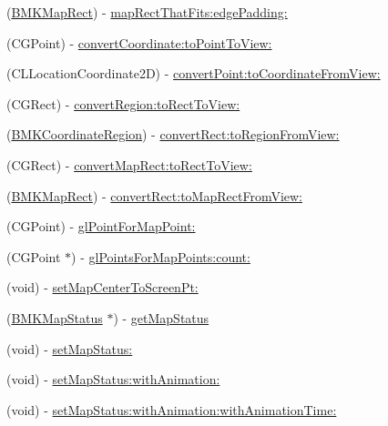 \begin{DoxyCompactItemize}
(\hyperlink{struct_b_m_k_map_rect}{B\+M\+K\+Map\+Rect}) -\/ \hyperlink{interface_b_m_k_map_view_a93e07fbbe602a9a493650158babd2349}{map\+Rect\+That\+Fits\+:edge\+Padding\+:}
\item 
(C\+G\+Point) -\/ \hyperlink{interface_b_m_k_map_view_a46ec1b9f485f41a04ffe76300624f5b4}{convert\+Coordinate\+:to\+Point\+To\+View\+:}
\item 
(C\+L\+Location\+Coordinate2\+D) -\/ \hyperlink{interface_b_m_k_map_view_a6ab0dbfdf28bf2ab29174d9a70ce2e9c}{convert\+Point\+:to\+Coordinate\+From\+View\+:}
\item 
(C\+G\+Rect) -\/ \hyperlink{interface_b_m_k_map_view_a952023c2e24a13c993977d276745f329}{convert\+Region\+:to\+Rect\+To\+View\+:}
\item 
(\hyperlink{struct_b_m_k_coordinate_region}{B\+M\+K\+Coordinate\+Region}) -\/ \hyperlink{interface_b_m_k_map_view_ae99130c0eceabae6c9e202699ba375d1}{convert\+Rect\+:to\+Region\+From\+View\+:}
\item 
(C\+G\+Rect) -\/ \hyperlink{interface_b_m_k_map_view_a4a802244887690c7238bd5c8e18918ae}{convert\+Map\+Rect\+:to\+Rect\+To\+View\+:}
\item 
(\hyperlink{struct_b_m_k_map_rect}{B\+M\+K\+Map\+Rect}) -\/ \hyperlink{interface_b_m_k_map_view_afa77dab84c13620c4ce0dee46df87b46}{convert\+Rect\+:to\+Map\+Rect\+From\+View\+:}
\item 
(C\+G\+Point) -\/ \hyperlink{interface_b_m_k_map_view_ad2ae70da77b6ba304cd37413fe5a5c78}{gl\+Point\+For\+Map\+Point\+:}
\item 
(C\+G\+Point $\ast$) -\/ \hyperlink{interface_b_m_k_map_view_a56625ec8600403ba03d20cfa0715ee61}{gl\+Points\+For\+Map\+Points\+:count\+:}
\item 
(void) -\/ \hyperlink{interface_b_m_k_map_view_afc552204ea098d293a4f0d7ebf35b8ac}{set\+Map\+Center\+To\+Screen\+Pt\+:}
\item 
(\hyperlink{interface_b_m_k_map_status}{B\+M\+K\+Map\+Status} $\ast$) -\/ \hyperlink{interface_b_m_k_map_view_a419f8ac73742ccf9ef7fb921b349bca4}{get\+Map\+Status}
\item 
(void) -\/ \hyperlink{interface_b_m_k_map_view_a595b3baaa42f35fd5fa3b778011a59d7}{set\+Map\+Status\+:}
\item 
(void) -\/ \hyperlink{interface_b_m_k_map_view_abf8e2308ae62e367f8b1271a9918060f}{set\+Map\+Status\+:with\+Animation\+:}
\item 
(void) -\/ \hyperlink{interface_b_m_k_map_view_a9668d8aa419c7a9140c79846fabc3598}{set\+Map\+Status\+:with\+Animation\+:with\+Animation\+Time\+:}

\end{DoxyCompactItemize}
